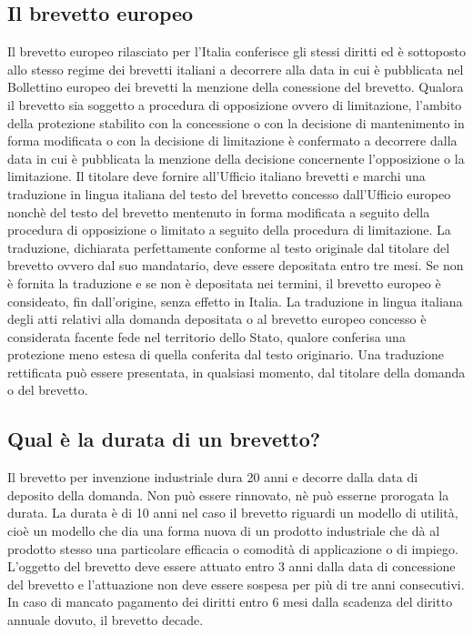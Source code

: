 \subsection{Il brevetto europeo}
Il brevetto europeo rilasciato per l'Italia conferisce gli stessi diritti ed è sottoposto allo stesso regime dei brevetti italiani a decorrere alla data
in cui è pubblicata nel Bollettino europeo dei brevetti la menzione della conessione del brevetto.\newline
Qualora il brevetto sia soggetto a procedura di opposizione ovvero di limitazione, l'ambito della protezione stabilito con la concessione o con la decisione
di mantenimento in forma modificata o con la decisione di limitazione è confermato a decorrere dalla data in cui è pubblicata la menzione della decisione
concernente l'opposizione o la limitazione. \newline
Il titolare deve fornire all'Ufficio italiano brevetti e marchi una traduzione in lingua italiana del testo del brevetto concesso dall'Ufficio europeo
nonchè del testo del brevetto mentenuto in forma modificata a seguito della procedura di opposizione o limitato a seguito della procedura di limitazione.\newline
La traduzione, dichiarata perfettamente conforme al testo originale dal titolare del brevetto ovvero dal suo mandatario, deve essere depositata entro tre mesi. \newline
Se non è fornita la traduzione e se non è depositata nei termini, il brevetto europeo è consideato, fin dall'origine,
senza effetto in Italia.\newline
La traduzione in lingua italiana degli atti relativi alla domanda depositata o al brevetto europeo concesso è considerata facente fede nel territorio dello
Stato, qualore conferisa una protezione meno estesa di quella conferita dal testo originario. Una traduzione rettificata può essere presentata, in qualsiasi momento, dal
titolare della domanda o del brevetto.

\subsection{Qual è la durata di un brevetto?}
Il brevetto per invenzione industriale dura 20 anni e decorre dalla data di deposito della domanda. \newline
Non può essere rinnovato, nè può esserne prorogata la durata.\newline
La durata è di 10 anni nel caso il brevetto riguardi un modello di utilità, cioè un modello che dia una forma nuova di un
prodotto industriale che dà al prodotto stesso una particolare efficacia o comodità di applicazione o di impiego. \newline
L'oggetto del brevetto deve essere attuato entro 3 anni dalla data di concessione del brevetto e l'attuazione non deve essere sospesa per più
di tre anni consecutivi.\newline
In caso di mancato pagamento dei diritti entro 6 mesi dalla scadenza del diritto annuale dovuto, il brevetto decade.

